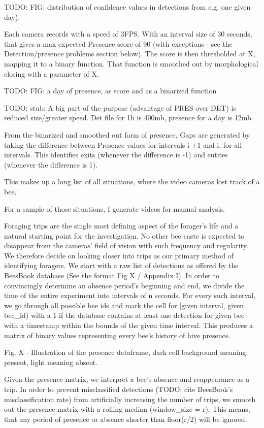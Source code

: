 TODO: FIG: distribution of confidence values in detections from e.g. one given day). 

Each camera records with a speed of 3FPS. With an interval size of 30 seconds,
that gives a max expected Presence score of 90 (with exceptions - see the
Detection/presence problems section below). The score is then thresholded at X,
mapping it to a binary function. That function is smoothed out by morphological
closing with a parameter of X. 

TODO: FIG: a day of presence, as score and as a binarized function

TODO: stub: A big part of the purpose (advantage of PRES over DET) is reduced
size/greater speed. Det file for 1h is 400mb, presence for a day is 12mb.


From the binarized and smoothed out form of presence, Gaps are generated by
taking the difference between Presence values for intervals i +1 and i, for all
intervals. This identifies exits (whenever the difference is -1) and entries
(whenever the difference is 1). 

This makes up a long list of all situations, where the video cameras lost track
of a bee. 

For a sample of those situations, I generate videos for manual analysis. 

Foraging trips are the single most defining aspect of the forager’s life and a
natural starting point for the investigation. No other bee caste is expected to
disappear from the cameras’ field of vision with such frequency and regularity.
We therefore decide on looking closer into trips as our primary method of
identifying foragers. We start with a raw list of detections as offered by the
BeesBook database (See the format Fig X / Appendix I). In order to convincingly
determine an absence period’s beginning and end, we divide the time of the
entire experiment into intervals of n seconds. For every such interval, we go
through all possible bee ids and mark the cell for [given interval, given
bee\_id) with a 1 if the database contains at least one detection for given bee
with a timestamp within the bounds of the given time interval. This produces a
matrix of binary values representing every bee’s history of hive presence.



Fig. X - Illustration of the presence dataframe, dark cell background meaning
present, light meaning absent. 


Given the presence matrix, we interpret a bee’s absence and reappearance as a
trip. In order to prevent misclassified detections (TODO: cite BeesBook’s
misclassification rate)  from artificially increasing the number of trips, we
smooth out the presence matrix with a rolling median (window\_size = r). This
means, that any period of presence or absence shorter than floor(r/2) will be
ignored.

